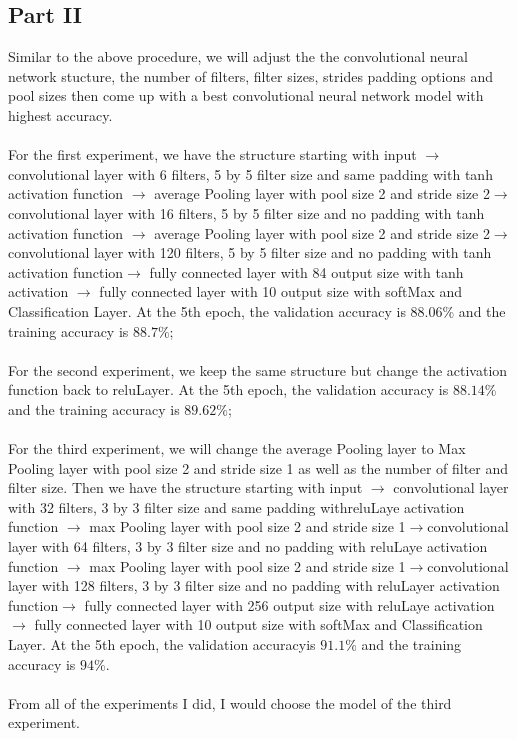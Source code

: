 \documentclass[12pt,letterpaper]{article}
\begin{document}
\subsection*{Part II}
 Similar to the above procedure, we will adjust the the convolutional neural network stucture, the number of filters, filter sizes, strides padding options and pool sizes then come up with a best convolutional neural network model with highest accuracy. 
\\
\\For the first experiment, we have the structure starting with input $\rightarrow$ convolutional layer with 6 filters, 5 by 5 filter size and same padding with tanh activation function $\rightarrow$ average Pooling layer with pool size 2 and stride size 2$\rightarrow$convolutional layer with 16 filters, 5 by 5 filter size and no padding with tanh activation function $\rightarrow$ average Pooling layer with pool size 2 and stride size 2$\rightarrow$convolutional layer with 120 filters, 5 by 5 filter size and no padding with tanh activation function$\rightarrow$ fully connected layer with 84 output size with tanh activation $\rightarrow$ fully connected layer with 10 output size with softMax and Classification Layer. At the 5th epoch, the validation accuracy is $88.06\%$ and the training accuracy is $88.7\%$;
\\
\\For the second experiment, we keep the same structure but change the activation function back to reluLayer. At the 5th epoch, the validation accuracy is $88.14\%$ and the training accuracy is $89.62\%$;
\\
\\For the third experiment, we will change the average Pooling layer to Max Pooling layer with pool size 2 and stride size 1 as well as the number of filter and filter size. Then we have the structure starting with input $\rightarrow$ convolutional layer with 32 filters, 3 by 3 filter size and same padding withreluLaye activation function $\rightarrow$ max Pooling layer with pool size 2 and stride size 1$\rightarrow$convolutional layer with 64 filters, 3 by 3 filter size and no padding with reluLaye activation function $\rightarrow$ max Pooling layer with pool size 2 and stride size 1$\rightarrow$convolutional layer with 128 filters, 3 by 3 filter size and no padding with reluLayer activation function$\rightarrow$ fully connected layer with 256 output size with reluLaye activation $\rightarrow$ fully connected layer with 10 output size with softMax and Classification Layer. At the 5th epoch, the validation accuracyis $91.1\%$ and the training accuracy is $94\%$. 
\\
\\From all of the experiments I did, I would choose the model of the third experiment.
\end{document}
